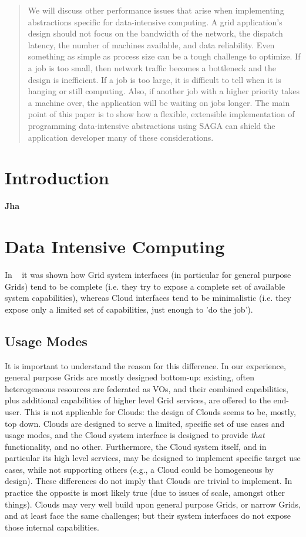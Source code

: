 \documentclass{article}
\newcommand{\I}[1]{\textit{#1}}
\begin{document}
\begin{abstract}
We will discuss other performance issues that arise when implementing
abstractions specific for data-intensive computing.  A grid
application's design should not focus on the bandwidth of the network,
the dispatch latency, the number of machines available, and data
reliability.  Even something as simple as process size can be a tough
challenge to optimize.  If a job is too small, then network traffic
becomes a bottleneck and the design is inefficient.  If a job is too
large, it is difficult to tell when it is hanging or still computing.
Also, if another job with a higher priority takes a machine over, the
application will be waiting on jobs longer.  The main point of this
paper is to show how a flexible, extensible implementation of
programming data-intensive abstractions using SAGA can shield the
application developer many of these considerations.

\end{abstract}

\section{Introduction} {\bf Jha} 


\section{Data Intensive Computing} 

In ~\cite{cloud-saga-paper} it was shown how Grid system interfaces
(in particular for general purpose Grids) tend to be complete
(i.e. they try to expose a complete set of available system
capabilities), whereas Cloud interfaces tend to be minimalistic
(i.e. they expose only a limited set of capabilities, just enough to
'do the job').
 
 \subsection{Usage Modes}

  It is important to understand the reason for this difference.  In
  our experience, general purpose Grids are mostly designed bottom-up:
  existing, often heterogeneous resources are federated as VOs, and
  their combined capabilities, plus additional capabilities of higher
  level Grid services, are offered to the end-user.  This is not
  applicable for Clouds: the design of Clouds seems to be, mostly, top
  down. Clouds are designed to serve a limited, specific set of use
  cases and usage modes, and the Cloud system interface is designed to
  provide \I{that} functionality, and no other.  Furthermore, the
  Cloud system itself, and in particular its high level services, may
  be designed to implement specific target use cases, while not
  supporting others (e.g., a Cloud could be homogeneous by design).
  These differences do not imply that Clouds are trivial to implement.
  In practice the opposite is most likely true (due to issues of
  scale, amongst other things). Clouds may very well build upon
  general purpose Grids, or narrow Grids, and at least face the same
  challenges; but their system interfaces do not expose those internal
  capabilities.
\end{document}

